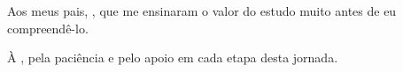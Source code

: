 \begin{dedicatoria}
  Aos meus pais, , que me ensinaram o valor do estudo
  muito antes de eu compreendê-lo.

  \vspace{1em}
  À , pela paciência e pelo apoio em cada etapa desta jornada.
\end{dedicatoria}